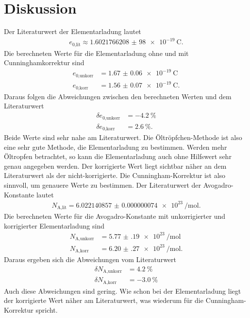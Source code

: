 \section{Diskussion}
\label{sec:Diskussion}

Der Literaturwert der Elementarladung \cite{elementary} lautet
\begin{align}
  e_\text{0,lit} \approx \SI{1.602 176 6208(98)e-19}{\coulomb}.
\end{align}
Die berechneten Werte für die Elementarladung ohne und mit Cunninghamkorrektur
sind
\begin{align}
  e_\text{0,unkorr} & = \SI{1.67(6)e-19}{\coulomb} \\
  e_\text{0,korr} & = \SI{1.56(7)e-19}{\coulomb}.
\end{align}
Daraus folgen die Abweichungen zwischen den berechneten Werten und dem Literaturwert
\begin{align}
  \delta e_\text{0,unkorr} & = \SI{-4.2}{\percent} \\
  \delta e_\text{0,korr} & = \SI{2.6}{\percent}.
\end{align}
Beide Werte sind sehr nahe am Literaturwert. Die Öltröpfchen-Methode ist
also eine sehr gute Methode, die Elementarladung zu bestimmen. Werden mehr
Öltropfen betrachtet, so kann die Elementarladung auch ohne Hilfswert sehr
genau angegeben werden.
Der korrigierte Wert liegt sichtbar näher an dem Literaturwert als der
nicht-korrigierte. Die Cunningham-Korrektur ist also sinnvoll, um genauere
Werte zu bestimmen.
Der Literaturwert der Avogadro-Konstante \cite{avogadro} lautet
\begin{align}
  N_\text{A,lit} = \SI{6.022140857(74)e23}{\per\mol}.
\end{align}
Die berechneten Werte für die Avogadro-Konstante mit unkorrigierter und
korrigierter Elementarladung sind
\begin{align}
    N_\text{A,unkorr} & = \SI{5.77(19)e23}{\per\mol}\\
    N_\text{A,korr} & = \SI{6.20(27)e23}{\per\mol}.
\end{align}
Daraus ergeben sich die Abweichungen vom Literaturwert
\begin{align}
  \delta N_\text{A,unkorr} & = \SI{4.2}{\percent} \\
  \delta N_\text{A,korr} & = \SI{-3.0}{\percent}
\end{align}
Auch diese Abweichungen sind gering. Wie schon bei der Elementarladung liegt
der korrigierte Wert näher am Literaturwert, was wiederum für die
Cunningham-Korrektur spricht.
